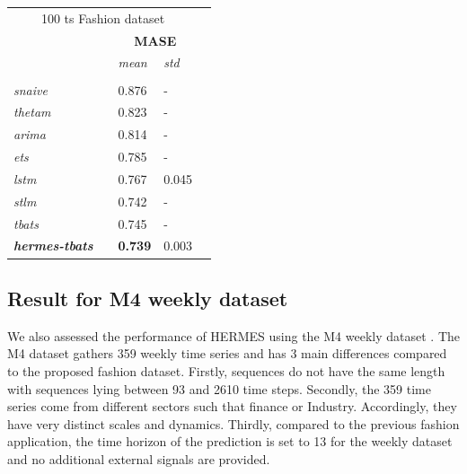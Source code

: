 \documentclass[review]{elsarticle}
\begin{document}
\begin{table}
{  \begin{tabular}{l||llll}
   \multicolumn{4}{c}{100 ts Fashion dataset}\vspace{0.5cm} \\
   &&\multicolumn{2}{c}{\textbf{MASE}} \\
    &&  \textit{mean}  & \textit{std}  \\
	\hline
	 &&& \\
     \textit{snaive} && 0.876 & - \\
     \textit{thetam}  && 0.823 & - \\
     \textit{arima} && 0.814 & - \\
     \textit{ets} && 0.785 & - \\
     \textit{lstm} && 0.767 & 0.045 \\
     \textit{stlm} && 0.742 & - \\
     \textit{tbats} && 0.745 & - \\
     \textbf{\textit{hermes-tbats}} && \textbf{0.739} & 0.003 \\
  \end{tabular}
 }
\label{tab:1000metricresults}
\end{table}


\subsection{Result for M4 weekly dataset}
\label{sec:m4result}

We also assessed the performance of HERMES using the M4 weekly dataset \cite{makridakis2020}. The M4 dataset gathers 359 weekly time series and has 3 main differences compared to the proposed fashion dataset. Firstly, sequences do not have the same length with sequences lying between 93 and 2610 time steps. Secondly, the 359 time series come from different sectors such that finance or Industry. Accordingly, they have very distinct scales and dynamics. Thirdly, compared to the previous fashion application, the time horizon of the prediction is set to 13 for the weekly dataset and no additional external signals are provided.
\end{document}
